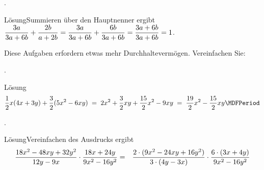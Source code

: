 \begin{MExercises}
\begin{MExercise}
\begin{MExerciseItems}
\item{. \begin{MHint}{Lösung}Summieren über den Hauptnenner ergibt
$\dfrac{3a}{3a+6b}+\dfrac{2b}{a+2b}=\dfrac{3a}{3a+6b}+\dfrac{6b}{3a+6b}=\dfrac{3a+6b}{3a+6b}=1$.\end{MHint}}
\end{MExerciseItems}
\end{MExercise}

\begin{MExercise}
Diese Aufgaben erfordern etwas mehr Durchhaltevermögen. Vereinfachen Sie:\ \\
\begin{MExerciseItems}
\item{. \begin{MHint}{Lösung} $$\Mdfrac12x(4x+3y)+\Mdfrac32(5x^2-6x y)\;=\; 2x^2+\Mdfrac32x y+\Mdfrac{15}2x^2-9x y \;=\; \Mdfrac{19}{2}x^2-\Mdfrac{15}{2}x y  \MDFPeriod  $$\end{MHint}}
\item{. \begin{MHint}{Lösung}Vereinfachen des Ausdrucks ergibt
\begin{eqnarray*}
\Mdfrac{18x^2-48x y+32y^2}{12y-9x}\cdot \Mdfrac{18x+24y}{9x^2-16y^2} & =&
\Mdfrac{2\cdot (9x^2-24x y+16y^2)}{3\cdot (4y-3x)}\cdot \Mdfrac{6\cdot (3x+4y)}{9x^2-16y^2}\\ %

\end{eqnarray*}
\end{MHint}}
\end{MExerciseItems}
\end{MExercise}
\end{MExercises}
